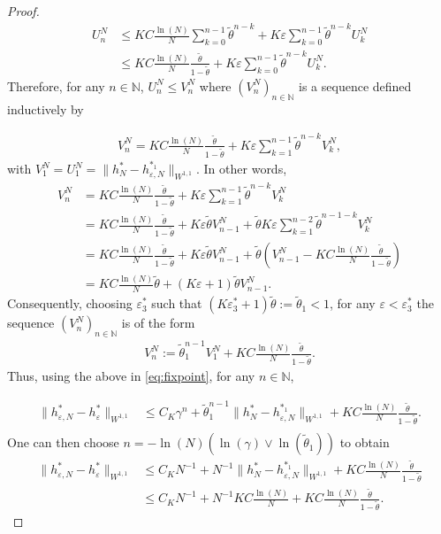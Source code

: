 \documentclass[10pt,a4paper]{amsart}
\newcommand{\eps}{\varepsilon}
\begin{document}
\begin{proof}
\begin{align*}
U_n^N &\leq KC\frac{\ln(N)}{N}\sum_{k=0}^{n-1}\tilde \theta^{n-k}+K\eps\sum_{k=0}^{n-1}\tilde \theta^{n-k}U_k^N\\
&\leq KC\frac{\ln(N)}{N}\frac{\tilde \theta}{1-\tilde \theta}+K\eps\sum_{k=0}^{n-1}\tilde \theta^{n-k}U_k^N.
\end{align*}
Therefore, for any $n\in \mathbb N$, $U_n^N\leq V_n^N$ where $(V_n^N)_{n\in \mathbb N}$ is a sequence defined inductively by

\begin{align*}
  V_n^N=KC\frac{\ln(N)}{N}\frac{\tilde \theta}{1-\tilde \theta}+K\eps\sum_{k=1}^{n-1}\tilde \theta^{n-k}V_k^N,
\end{align*}
with $V_1^N=U_1^N=\|h_N^*-h_{\eps,N}^{*_1}\|_{W^{1,1}}$. In other words, 
\begin{align*}
  V_n^N&=KC\frac{\ln(N)}{N}\frac{\tilde \theta}{1-\tilde \theta}+K\eps\sum_{k=1}^{n-1}\tilde \theta^{n-k}V_k^N\\
  &=KC\frac{\ln(N)}{N}\frac{\tilde \theta}{1-\tilde \theta}+K\eps \tilde \theta V_{n-1}^N +\tilde \theta K \eps\sum_{k=1}^{n-2}\tilde \theta^{n-1-k}V_k^N\\
  &=KC\frac{\ln(N)}{N}\frac{\tilde \theta}{1-\tilde \theta}+K\eps \tilde \theta V_{n-1}^N +\tilde \theta \left( V_{n-1}^N-KC\frac{\ln(N)}{N}\frac{\tilde \theta}{1-\tilde \theta}\right)\\
&=KC\frac{\ln(N)}{N}\tilde \theta+(K\eps +1)\tilde \theta  V_{n-1}^N.
\end{align*}
Consequently, choosing $\eps_{3}^*$ such that $(K\eps_{3}^* +1)\tilde \theta:=\tilde\theta_1<1$, for any $\eps <\eps_{3}^*$ the sequence $(V_n^N)_{n\in \mathbb N}$ is of the form
\begin{align*}
V_n^N:=\tilde\theta_1^{n-1}V_1^N+KC\frac{\ln(N)}{N}\frac{\tilde \theta}{1-\tilde \theta}.
\end{align*}
Thus, using the above in \eqref{eq:fixpoint}, for any $n\in \mathbb N$,

\begin{align*}
\|h_{\varepsilon,N}^*-h_\eps^*\|_{W^{1,1}}
&\leq C_K \gamma^n+\tilde\theta_1^{n-1}\|h_N^*-h_{\eps,N}^{*_1}\|_{W^{1,1}}+KC\frac{\ln(N)}{N}\frac{\tilde \theta}{1-\tilde \theta}.\\
\end{align*}
One can then choose $n=-\ln(N)(\ln(\gamma)\vee \ln(\tilde\theta_1))$ to obtain
\begin{align*}
\|h_{\varepsilon,N}^*-h_\eps^*\|_{W^{1,1}}&\leq  C_K N^{-1}+N^{-1}\|h_N^*-h_{\eps,N}^{*_1}\|_{W^{1,1}}+KC\frac{\ln(N)}{N}\frac{\tilde \theta}{1-\tilde \theta}\\
&\leq  C_K N^{-1}+N^{-1}KC\frac{\ln(N)}{N}+KC\frac{\ln(N)}{N}\frac{\tilde \theta}{1-\tilde \theta}.
\end{align*}
\end{proof}
\end{document}
